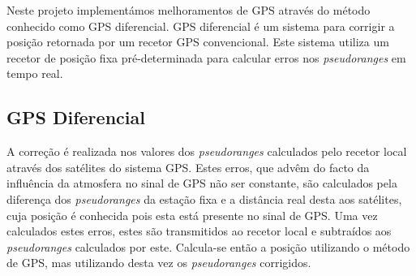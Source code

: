 \documentclass{article}
\begin{document}
Neste projeto implementámos melhoramentos de GPS através do método
conhecido como GPS diferencial. GPS diferencial é um sistema para
corrigir a posição retornada por um recetor GPS convencional. Este
sistema utiliza um recetor de posição fixa pré-determinada para
calcular erros nos \textit{pseudoranges} em tempo real.

\subsection{GPS Diferencial}

A correção é realizada nos valores dos \textit{pseudoranges}
calculados pelo recetor local através dos satélites do sistema GPS.
Estes erros, que advêm do facto da influência da atmosfera no sinal
de GPS não ser constante, são calculados pela diferença dos
\textit{pseudoranges} da estação fixa e a distância real desta aos
satélites, cuja posição é conhecida pois esta está presente no sinal
de GPS. Uma vez calculados estes erros, estes são transmitidos ao
recetor local e subtraídos aos \textit{pseudoranges} calculados por
este. Calcula-se então a posição utilizando o método de GPS, mas
utilizando desta vez os \textit{pseudoranges} corrigidos.
\end{document}
